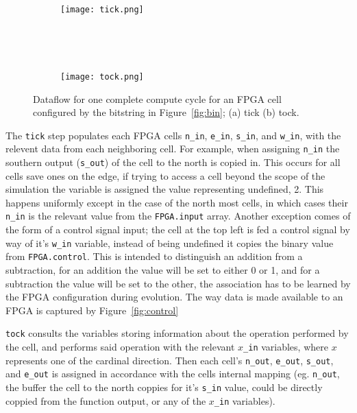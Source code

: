 \begin{figure}
	\centering
	\begin{subfigure}[ht]{0.45\textwidth}
		\texttt{[image: tick.png]}
		\caption{}
	\end{subfigure}
	~
	\begin{subfigure}[ht]{0.08\textwidth}
	\end{subfigure}
	~
	\begin{subfigure}[ht]{0.45\textwidth}
		\texttt{[image: tock.png]}
		\caption{}
	\end{subfigure}

	\caption{Dataflow for one complete compute cycle for an FPGA cell configured by the bitstring in
	Figure~\ref{fig:bin}; (a) tick (b) tock.}
	\label{fig:ticktock}
\end{figure}

The \texttt{tick} step populates each FPGA cells \texttt{n\_in}, \texttt{e\_in},
\texttt{s\_in}, and \texttt{w\_in}, with the relevent data from each neighboring cell.
For example, when assigning \texttt{n\_in} the southern output (\texttt{s\_out})
of the cell to the north is copied in. This occurs for all cells save ones on the edge, if trying
to access a cell beyond the scope of the simulation the variable is assigned the value
representing undefined, 2. This happens uniformly except in the case of the north most cells,
in which cases their \texttt{n\_in} is the relevant value from the \texttt{FPGA.input}
array. Another exception comes of the form of a control signal input; the cell at the top
left is fed a control signal by way of it's \texttt{w\_in} variable, instead of being undefined
it copies the binary value from \texttt{FPGA.control}. This is intended to distinguish
an addition from a subtraction, for an addition the value will be set to either 0 or 1,
and for a subtraction the value will be set to the other, the association has to be
learned by the FPGA configuration during evolution. The way data is made available to an FPGA
is captured by Figure~\ref{fig:control}

\texttt{tock} consults the variables storing information about the operation
performed by the cell, and performs said operation with the relevant $x$\texttt{\_in} variables,
where $x$ represents one of the cardinal direction.
Then each cell's \texttt{n\_out}, \texttt{e\_out}, \texttt{s\_out}, and \texttt{e\_out}
is assigned in accordance with the cells internal mapping (eg. \texttt{n\_out}, the
buffer the cell to the north coppies for it's \texttt{s\_in} value, could be directly
coppied from the function output, or any of the $x$\texttt{\_in} variables).

